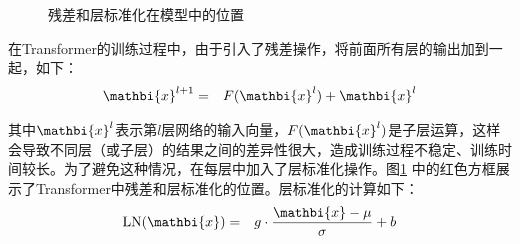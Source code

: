 
%



\begin{figure}[htp]
\centering

\caption{残差和层标准化在模型中的位置}
\label{fig:12-14}
\end{figure}

\parinterval 在Transformer的训练过程中，由于引入了残差操作，将前面所有层的输出加到一起，如下：
\begin{eqnarray}
\mathbi{x}^{l+1} &=& F (\mathbi{x}^l) + \mathbi{x}^l
\label{eq:12-12}
\end{eqnarray}

\noindent 其中$\mathbi{x}^l$表示第$l$层网络的输入向量，$F (\mathbi{x}^l)$是子层运算，这样会导致不同层（或子层）的结果之间的差异性很大，造成训练过程不稳定、训练时间较长。为了避免这种情况，在每层中加入了层标准化操作。图\ref{fig:12-14} 中的红色方框展示了Transformer中残差和层标准化的位置。层标准化的计算如下：
\begin{eqnarray}
\textrm{LN}(\mathbi{x}) &=& g \cdot \frac{\mathbi{x}- \mu} {\sigma} + b
\label{eq:12-13}
\end{eqnarray}

